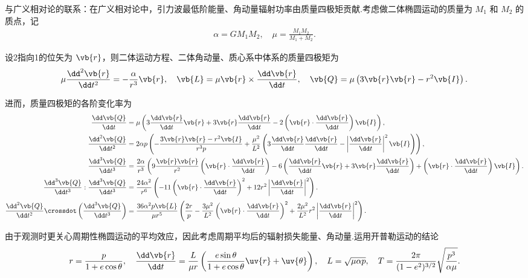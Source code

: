 \begin{note}
	与广义相对论的联系：在广义相对论中，引力波最低阶能量、角动量辐射功率由质量四极矩贡献.考虑做二体椭圆运动的质量为 \(M_1\) 和 \(M_2\) 的质点，记
	\begin{align*}
		\alpha = G M_1 M_2, \quad \mu = \frac{M_1 M_2}{M_1 + M_2}.
	\end{align*}

	设2指向1的位矢为 \(\vb{r}\)，则二体运动方程、二体角动量、质心系中体系的质量四极矩为
	\begin{align*}
		\mu \frac{\dd^2\vb{r}}{\dd t^2} = -\frac{\alpha}{r^3}\vb{r}, \quad \vb{L} = \mu \vb{r} \times \frac{\dd \vb{r}}{\dd t}, \quad \vb{Q} = \mu \left( 3\vb{r}\vb{r} - r^2 \vb{I} \right).
	\end{align*}

	进而，质量四极矩的各阶变化率为
	\begin{align*}
		\frac{\dd \vb{Q}}{\dd t} &= \mu \left( 3\frac{\dd \vb{r}}{\dd t}\vb{r} + 3\vb{r}\frac{\dd \vb{r}}{\dd t} - 2\left( \vb{r} \cdot \frac{\dd \vb{r}}{\dd t} \right)\vb{I} \right), \\
		\frac{\dd^2\vb{Q}}{\dd t^2} &= 2\alpha p \left( -\frac{3\vb{r}\vb{r} - r^2 \vb{I}}{r^3 p} + \frac{\mu^2}{L^2} \left( 3\frac{\dd \vb{r}}{\dd t}\frac{\dd \vb{r}}{\dd t} - \left| \frac{\dd \vb{r}}{\dd t} \right|^2 \vb{I} \right) \right), \\
		\frac{\dd^3\vb{Q}}{\dd t^3} &= \frac{2\alpha}{r^3} \left( 9\frac{\vb{r}\vb{r}}{r^2} \left( \vb{r} \cdot \frac{\dd \vb{r}}{\dd t} \right) - 6\left( \frac{\dd \vb{r}}{\dd t}\vb{r} + 3\vb{r}\frac{\dd \vb{r}}{\dd t} \right) + \left( \vb{r} \cdot \frac{\dd \vb{r}}{\dd t} \right)\vb{I} \right).\\
		\frac{\dd^3\vb{Q}}{\dd t^3} : \frac{\dd^3\vb{Q}}{\dd t^3} &= \frac{24\alpha^2}{r^6} \left( -11\left( \vb{r} \cdot \frac{\dd \vb{r}}{\dd t} \right)^2 + 12 r^2 \left| \frac{\dd \vb{r}}{\dd t} \right|^2 \right).\\
		\frac{\dd^2\vb{Q}}{\dd t^2} \crossdot \left( \frac{\dd^3\vb{Q}}{\dd t^3} \right) &= \frac{36\alpha^2 p \vb{L}}{\mu r^5} \left( \frac{2r}{p} - \frac{3\mu^2}{L^2} \left( \vb{r} \cdot \frac{\dd \vb{r}}{\dd t} \right)^2 + \frac{2\mu^2}{L^2} r^2 \left| \frac{\dd \vb{r}}{\dd t} \right|^2 \right).
	\end{align*}

	由于观测时更关心周期性椭圆运动的平均效应，因此考虑周期平均后的辐射损失能量、角动量.运用开普勒运动的结论
	\begin{align*}
		r = \frac{p}{1 + e\cos\theta}, \quad \frac{\dd \vb{r}}{\dd t} = \frac{L}{\mu r} \left( \frac{e\sin\theta}{1 + e\cos\theta}\uv{r} + \uv{\theta} \right), \quad L = \sqrt{\mu\alpha p}, \quad T = \frac{2\pi}{(1 - e^2)^{3/2}} \sqrt{\frac{p^3}{\alpha\mu}}.
	\end{align*}


\end{note}
